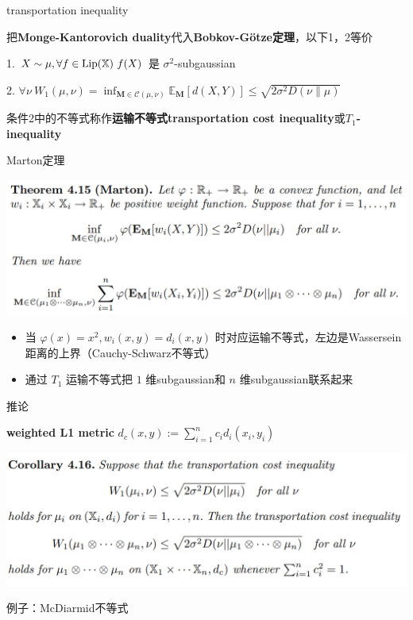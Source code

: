 \documentclass{beamer}
\begin{document}
\begin{frame}{transportation inequality}

把\textbf{Monge-Kantorovich duality}代入\textbf{Bobkov-G{\"o}tze定理}，以下1，2等价

1. $X\sim\mu, \forall f\in{\rm Lip}(\mathbb{X})\ f(X)$ 是 $\sigma^2$-subgaussian

2. $\forall \nu\ W_1(\mu, \nu) = \inf_{\mathbf{M} \in \mathcal{C}(\mu,\nu)} \mathbb{E}_{\mathbf{M}} [d(X, Y)] \le \sqrt{2\sigma^{2}D(\nu\|\mu)}$

条件2中的不等式称作\textbf{运输不等式transportation cost inequality}或\textbf{$T_1$-inequality}

\end{frame}

\begin{frame}{Marton定理}

\begin{center}
\includegraphics[width=1.0\textwidth, frame]{figures/4-15-thm.png}
\end{center}

\begin{itemize}
    \item 当 $\varphi(x)=x^2, w_i(x, y) = d_i(x, y)$ 时对应运输不等式，左边是Wassersein距离的上界（Cauchy-Schwarz不等式）
    \item 通过 $T_1$ 运输不等式把 $1$ 维subgaussian和 $n$ 维subgaussian联系起来
\end{itemize}

\end{frame}

\begin{frame}{推论}

\textbf{weighted L1 metric} $d_c(x, y) := \sum_{i=1}^{n} c_i d_i(x_i, y_i)$

\begin{center}
\includegraphics[width=1.0\textwidth, frame]{figures/4-16-corollary.png}
\end{center}

例子：McDiarmid不等式

\end{frame}
\end{document}
